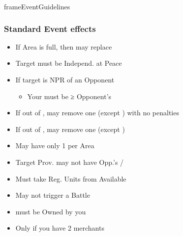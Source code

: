 \documentclass[10pt]{article}
\newlength{\fhEventGuidelines} \setlength\fhEventGuidelines{34\baselineskip}
\begin{document}
\begin{dynamiccontents*}{frameEventGuidelines}
\begin{eubox}{\fhEventGuidelines}
\begin{multicols*}{2}
		\subsubsection*{Standard Event effects }
		\begin{itemize}
			\item If Area is full, then may replace \influence
		\end{itemize}
		\begin{itemize}
			\item Target must be Independ.  at Peace
			\item If target is NPR \ally of an Opponent
			\begin{itemize}
				\item Your \influence must be ≥ Opponent's \influence
			\end{itemize}
			\item If out of \alliances, may remove one (except \activeally) with no penalties
		\end{itemize}
		\begin{itemize}
			\item If out of \marriages, may remove one (except \disputedsuccession)
		\end{itemize}
		\begin{itemize}
			\item May have only 1 per Area
		\end{itemize}
		\begin{itemize}
			\item Target Prov. may not have Opp.'s \town/\vassal
		\end{itemize}
		\begin{itemize}
			\item Must take Reg. Units from Available \manpower
			\item May not trigger a Battle
		\end{itemize}
		\begin{itemize}
			\item \town must be Owned by you
		\end{itemize}	
		\begin{itemize}
			\item Only if you have 2 merchants

\end{itemize}
\end{multicols*}
\end{eubox}
\end{dynamiccontents*}
\end{document}
